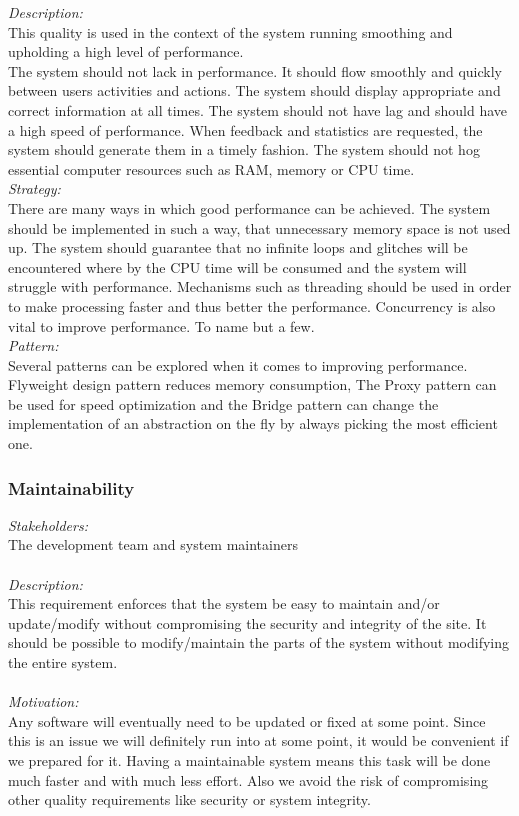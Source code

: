\documentclass[a4paper,12pt]{report}
\begin{document}
		\emph{Description: }\\This quality is used in the context of the system running smoothing and upholding a high level of performance. \\
		The system should not lack in performance. It should flow smoothly and quickly between users activities and actions. The system should display appropriate and correct information at all times. The system should not have lag and should have a high speed of performance. When feedback and statistics are requested, the system should generate them in a timely fashion. The system should not hog essential computer resources such as RAM, memory or CPU time.\\
		
		\emph{Strategy: }\\ There are many ways in which good performance can be achieved. The system should be implemented in such a way, that unnecessary memory space is not used up. The system should guarantee that no infinite loops and glitches will be encountered where by the CPU time will be consumed and the system will struggle with performance. Mechanisms such as threading should be used in order to make processing faster and thus better the performance. Concurrency is also vital to improve performance. To name but a few. \\
		
		\emph{Pattern: }\\ Several patterns can be explored when it comes to improving performance. Flyweight design pattern reduces memory consumption, The Proxy pattern can be used for speed optimization and the Bridge pattern can change the implementation of an abstraction on the fly by always picking the most efficient one.\\
		
		\subsubsection{Maintainability}
		\emph{Stakeholders: }\\ The development team and system maintainers \\ 
		\\\emph{Description: }\\ This requirement enforces that the system be easy to maintain and/or update/modify without compromising the security and integrity of the site. It should be possible to modify/maintain the parts of the system without modifying the entire system. \\
		\\\emph{Motivation: }\\ Any software will eventually need to be updated or fixed at some point. Since this is an issue we will definitely run into at some point, it would be convenient if we prepared for it. Having a maintainable system means this task will be done much faster and with much less effort. Also we avoid the risk of compromising other quality requirements like security or system integrity. \\ 
		 
\end{document}
